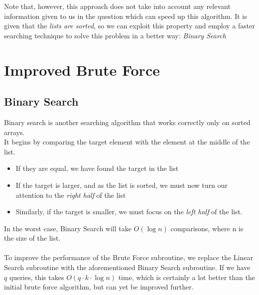 \documentclass[11pt]{article}
\begin{document}
Note that, however, this approach does not take into account any relevant information given to us in the question which can speed up this algorithm. It is given that the \textit{lists are sorted}, so we can exploit this property and employ a faster searching technique to solve this problem in a better way: \textit{Binary Search}




\section{Improved Brute Force}
\subsection{Binary Search}



Binary search is another searching algorithm that works correctly only on sorted arrays. \\
It begins by comparing the target element with the element at the middle of the list. 
\begin{itemize}
    \item If they are equal, we have found the target in the list
    \item If the target is larger, and as the list is sorted, we must now turn our attention to the \textit{right half} of the list
    \item Similarly, if the target is smaller, we must focus on the \textit{left half} of the list.
\end{itemize}

In the worst case, Binary Search will take $O(\log n)$ comparisons, where n is the size of the list. \\ \\


To improve the performance of the Brute Force subroutine, we replace the Linear Search subroutine with the aforementioned Binary Search subroutine. If we have $q$ queries, this takes $O(q \cdot k \cdot \log n)$ time, which is certainly a lot better than the initial brute force algorithm, but can yet be improved further.
\end{document}
